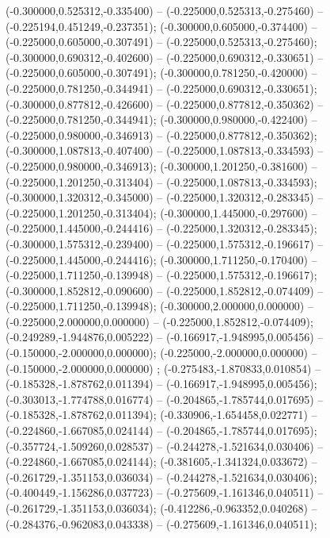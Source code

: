  (-0.300000,0.525312,-0.335400) -- (-0.225000,0.525313,-0.275460) -- (-0.225194,0.451249,-0.237351);
 (-0.300000,0.605000,-0.374400) -- (-0.225000,0.605000,-0.307491) -- (-0.225000,0.525313,-0.275460);
 (-0.300000,0.690312,-0.402600) -- (-0.225000,0.690312,-0.330651) -- (-0.225000,0.605000,-0.307491);
 (-0.300000,0.781250,-0.420000) -- (-0.225000,0.781250,-0.344941) -- (-0.225000,0.690312,-0.330651);
 (-0.300000,0.877812,-0.426600) -- (-0.225000,0.877812,-0.350362) -- (-0.225000,0.781250,-0.344941);
 (-0.300000,0.980000,-0.422400) -- (-0.225000,0.980000,-0.346913) -- (-0.225000,0.877812,-0.350362);
 (-0.300000,1.087813,-0.407400) -- (-0.225000,1.087813,-0.334593) -- (-0.225000,0.980000,-0.346913);
 (-0.300000,1.201250,-0.381600) -- (-0.225000,1.201250,-0.313404) -- (-0.225000,1.087813,-0.334593);
 (-0.300000,1.320312,-0.345000) -- (-0.225000,1.320312,-0.283345) -- (-0.225000,1.201250,-0.313404);
 (-0.300000,1.445000,-0.297600) -- (-0.225000,1.445000,-0.244416) -- (-0.225000,1.320312,-0.283345);
 (-0.300000,1.575312,-0.239400) -- (-0.225000,1.575312,-0.196617) -- (-0.225000,1.445000,-0.244416);
 (-0.300000,1.711250,-0.170400) -- (-0.225000,1.711250,-0.139948) -- (-0.225000,1.575312,-0.196617);
 (-0.300000,1.852812,-0.090600) -- (-0.225000,1.852812,-0.074409) -- (-0.225000,1.711250,-0.139948);
 (-0.300000,2.000000,0.000000) -- (-0.225000,2.000000,0.000000) -- (-0.225000,1.852812,-0.074409);
 (-0.249289,-1.944876,0.005222) -- (-0.166917,-1.948995,0.005456) -- (-0.150000,-2.000000,0.000000);
 (-0.225000,-2.000000,0.000000) -- (-0.150000,-2.000000,0.000000) ;
 (-0.275483,-1.870833,0.010854) -- (-0.185328,-1.878762,0.011394) -- (-0.166917,-1.948995,0.005456);
 (-0.303013,-1.774788,0.016774) -- (-0.204865,-1.785744,0.017695) -- (-0.185328,-1.878762,0.011394);
 (-0.330906,-1.654458,0.022771) -- (-0.224860,-1.667085,0.024144) -- (-0.204865,-1.785744,0.017695);
 (-0.357724,-1.509260,0.028537) -- (-0.244278,-1.521634,0.030406) -- (-0.224860,-1.667085,0.024144);
 (-0.381605,-1.341324,0.033672) -- (-0.261729,-1.351153,0.036034) -- (-0.244278,-1.521634,0.030406);
 (-0.400449,-1.156286,0.037723) -- (-0.275609,-1.161346,0.040511) -- (-0.261729,-1.351153,0.036034);
 (-0.412286,-0.963352,0.040268) -- (-0.284376,-0.962083,0.043338) -- (-0.275609,-1.161346,0.040511);

